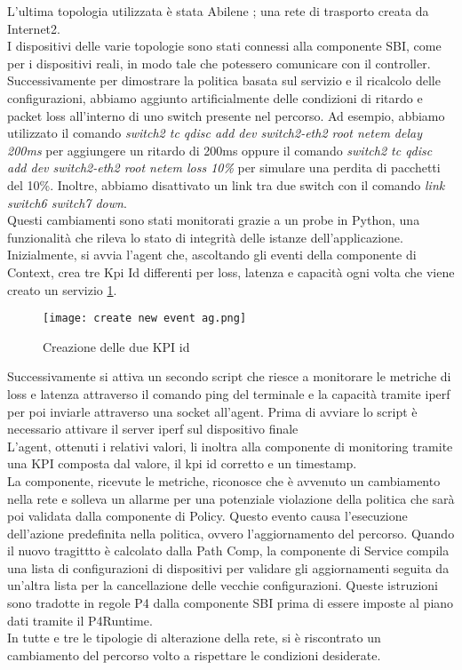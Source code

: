 L'ultima topologia utilizzata è stata Abilene \cite{abilene}; una rete di trasporto creata da Internet2.
\\I dispositivi delle varie topologie sono stati connessi alla componente SBI, come per i dispositivi reali, in modo tale che potessero comunicare con il controller.
Successivamente per dimostrare la politica basata sul servizio e il ricalcolo delle configurazioni, abbiamo aggiunto artificialmente delle condizioni di ritardo e packet loss all’interno di uno switch presente nel percorso. 
Ad esempio, abbiamo utilizzato il comando \textit{switch2 tc qdisc add dev switch2-eth2 root netem delay 200ms} per aggiungere un ritardo di 200ms oppure il comando \textit{switch2 tc qdisc add dev switch2-eth2 root netem loss 10\%}
 per simulare una perdita di pacchetti del 10\%. Inoltre, abbiamo disattivato un link tra due switch con il comando \textit{link switch6 switch7 down}.
\\Questi cambiamenti sono stati monitorati grazie a un probe in Python, una funzionalità che rileva lo stato di integrità delle istanze dell'applicazione.
Inizialmente, si avvia l'agent che, ascoltando gli eventi della componente di Context, crea tre Kpi Id differenti per loss, latenza e capacità ogni volta che viene creato un servizio \ref{fig:agent}.
\begin{figure}[h]
    \centering
   \texttt{[image: create new event ag.png]}
    \caption{Creazione delle due KPI id}
    \label{fig:agent}
\end{figure}
Successivamente si attiva un secondo script che riesce a monitorare le metriche di loss e latenza attraverso il comando ping del terminale e la capacità tramite iperf per poi inviarle attraverso una socket all'agent.
Prima di avviare lo script è necessario attivare il server iperf sul dispositivo finale
\\L'agent, ottenuti i relativi valori, li inoltra alla componente di monitoring tramite una KPI composta dal valore, il kpi id corretto e un timestamp.
\\La componente, ricevute le metriche, riconosce che è avvenuto un cambiamento nella rete e solleva un allarme per una potenziale violazione della politica che sarà poi validata dalla componente di Policy.
Questo evento causa l'esecuzione dell'azione predefinita nella politica, ovvero l'aggiornamento del percorso.
Quando il nuovo tragittto è calcolato dalla Path Comp, la componente di Service compila una lista di configurazioni di dispositivi per validare gli aggiornamenti 
seguita da un'altra lista per la cancellazione delle vecchie configurazioni. Queste istruzioni sono tradotte in regole P4 dalla componente SBI prima di essere imposte al piano dati 
tramite il P4Runtime.
\\In tutte e tre le tipologie di alterazione della rete, si è riscontrato un cambiamento del percorso volto a rispettare le condizioni desiderate. 

